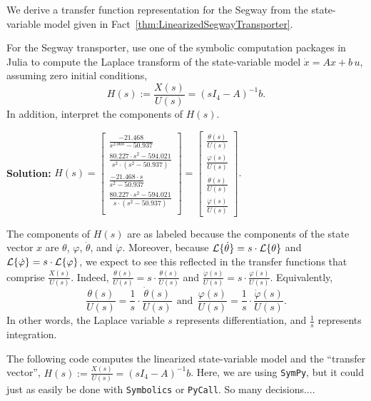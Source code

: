 We derive a transfer function representation for the Segway from the state-variable model given in Fact~\ref{thm:LinearizedSegwayTransporter}.\\ 

\begin{example} For the Segway transporter, use one of the symbolic computation packages in Julia to compute the Laplace transform of the state-variable model $\dot{x} = Ax + b\, u$, assuming zero initial conditions, 
$$H(s):= \frac{X(s)}{U(s)} =(s I_4 -A)^{-1} b.$$
In addition, interpret the components of $H(s)$.
\end{example}
\textbf{Solution:} \quad \Ans \quad $H(s)=\left[
\begin{array}{c}
\frac{-21.468}{s^{2.000} - 50.937} \\[1em]
\frac{80.227 \cdot s^{2} - 594.021}{s^{2} \cdot \left( s^{2} - 50.937 \right)} \\[1em]
\frac{-21.468 \cdot s}{s^{2} - 50.937} \\[1em]
\frac{80.227 \cdot s^{2} - 594.021}{s \cdot \left( s^{2} - 50.937 \right)} \\[1em]
\end{array}
\right] = \left[
\begin{array}{c}
\frac{\theta(s)}{U(s)} \\[1em]
\frac{\varphi(s)}{U(s)}\\[1em]
\frac{\dot{\theta}(s)}{U(s)} \\[1em]
\frac{\dot{\varphi}(s)}{U(s)}
\end{array}
\right].$


The components of $H(s)$ are as labeled because the components of the state vector $x$ are $\theta$, $\varphi$, $\dot{\theta}$, and  $\dot{\varphi}$. Moreover, because ${\cal L}\{ \dot{\theta}\} = s \cdot {\cal L}\{ \theta\}$ and ${\cal L}\{ \dot{\varphi}\} = s \cdot {\cal L}\{ \varphi\}$, we expect to see this reflected in the transfer functions that comprise $\frac{X(s)}{U(s)}$. Indeed, $\frac{\dot{\theta}(s)}{U(s)}  = s \cdot \frac{\theta(s)}{U(s)}$ and $\frac{\dot{\varphi}(s)}{U(s)} = s \cdot \frac{\varphi(s)}{U(s)}$. Equivalently, 
$$ \frac{\theta(s)}{U(s)} = \frac{1}{s} \cdot \frac{\dot{\theta}(s)}{U(s)}~~\text{and}~~\frac{\varphi(s)}{U(s)}= \frac{1}{s} \cdot  \frac{\dot{\varphi}(s)}{U(s)}. $$
In other words, the Laplace variable $s$ represents differentiation, and $\frac{1}{s}$ represents integration.

\vspace*{.2cm}

The following code computes the linearized state-variable model and the ``transfer vector'', $H(s) :=\frac{X(s)}{U(s)} = (sI_4 - A)^{-1} b$. Here, we are using \texttt{SymPy}, but it could just as easily be done with \texttt{Symbolics} or \texttt{PyCall}. So many decisions....
\vspace*{.2cm}

